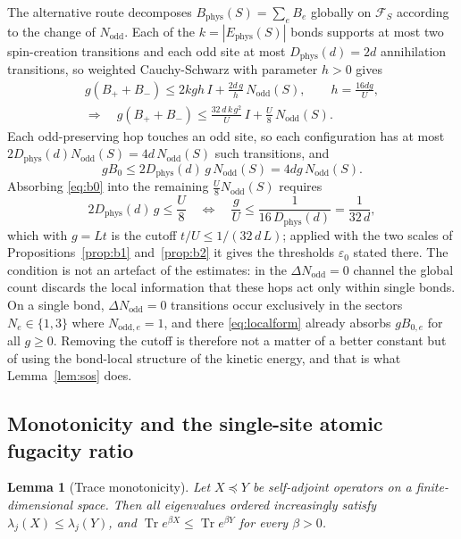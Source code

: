 \documentclass[11pt]{article}
\theoremstyle{plain}
\newtheorem{lemma}{Lemma}
\theoremstyle{definition}
\DeclareMathOperator{\Tr}{Tr}
\newcommand{\Nodd}{N_{\mathrm{odd}}}
\newcommand{\Dphys}{D_{\mathrm{phys}}}
\begin{document}
The alternative route decomposes $B_{\mathrm{phys}}(S)=\sum_{e}B_e$ globally on
$\mathcal F_S$ according to the change of $\Nodd$. Each of the $k=|E_{\mathrm{phys}}(S)|$
bonds supports at most two spin-creation transitions and each odd site at most
$\Dphys(d)=2d$ annihilation transitions, so weighted Cauchy-Schwarz with parameter
$h>0$ gives
\begin{equation}\label{eq:cs}
\begin{gathered}
 g(B_++B_-)\le2kgh\,I+\frac{2d\,g}{h}\,\Nodd(S),
 \qquad h=\frac{16dg}{U},\\
\Longrightarrow\quad
 g(B_++B_-)\le\frac{32\,d\,k\,g^2}{U}\,I+\frac U8\,\Nodd(S).
\end{gathered}
\end{equation}
Each odd-preserving hop touches an odd site, so each configuration has at most
$2\Dphys(d)\Nodd(S)=4d\,\Nodd(S)$ such transitions, and
\begin{equation}\label{eq:b0}
 gB_0\le2\Dphys(d)\,g\,\Nodd(S)=4dg\,\Nodd(S).
\end{equation}
Absorbing \eqref{eq:b0} into the remaining $\frac U8\Nodd(S)$ requires
\begin{equation}\label{eq:smallcutoff}
 2\Dphys(d)\,g\le\frac U8
 \quad\Longleftrightarrow\quad
 \frac{g}{U}\le\frac{1}{16\,\Dphys(d)}=\frac{1}{32\,d},
\end{equation}
which with $g=Lt$ is the cutoff $t/U\le1/(32\,d\,L)$; applied with the two scales
of Propositions~\ref{prop:b1} and~\ref{prop:b2} it gives the thresholds
$\varepsilon_0$ stated there. The condition is not an artefact of the
estimates: in the $\Delta\Nodd=0$ channel the global count discards the local
information that these hops act only within single bonds. On a single bond,
$\Delta\Nodd=0$ transitions occur exclusively in the sectors $N_e\in\{1,3\}$ where
$N_{\mathrm{odd},e}=1$, and there \eqref{eq:localform} already absorbs $gB_{0,e}$ for
all $g\ge0$. Removing the cutoff is therefore not a matter of a better constant but of
using the bond-local structure of the kinetic energy, and that is what
Lemma~\ref{lem:sos} does.

\subsection{Monotonicity and the single-site atomic fugacity ratio}

\begin{lemma}[Trace monotonicity]\label{lem:monotone}
Let $X\preceq Y$ be self-adjoint operators on a finite-dimensional space. Then all
eigenvalues ordered increasingly satisfy $\lambda_j(X)\le\lambda_j(Y)$, and
$\Tr e^{\beta X}\le\Tr e^{\beta Y}$ for every $\beta>0$.
\end{lemma}
\end{document}
